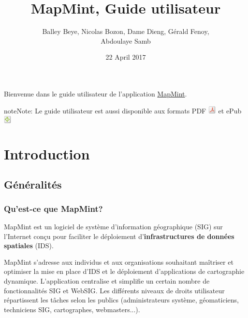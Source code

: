 \documentclass[letterpaper,10pt,french]{sphinxmanual}
\title{MapMint, Guide utilisateur}
\date{22 April 2017}
\author{Balley Beye, Nicolas Bozon, Dame Dieng, Gérald Fenoy, \\Abdoulaye Samb}
\begin{document}
\maketitle
\tableofcontents
{}\label{index::doc}


Bienvenue dans le guide utilisateur de l'application \href{http://mapmint.com}{MapMint}.

\begin{notice}{note}{Note:}
Le guide utilisateur est aussi disponible aux formats
PDF \includegraphics{pdf.png}  et ePub \includegraphics{epub.png}
\end{notice}


\chapter{Introduction}
\label{introduction/index:table-des-matieres}\label{introduction/index:home}\label{introduction/index::doc}\label{introduction/index:dashboard}\label{introduction/index:introduction}

\section{Généralités}
\label{introduction/introduction:generalites}\label{introduction/introduction::doc}\label{introduction/introduction:userguidegeneral}

\subsection{Qu’est-ce que MapMint?}
\label{introduction/introduction:quest-ce-que-mapmint}
MapMint est un logiciel de système d'information géographique (SIG) sur l'Internet  conçu pour faciliter le déploiement d'\textbf{infrastructures de données spatiales} (IDS).

MapMint s'adresse aux individus et aux organisations souhaitant maîtriser et optimiser la mise en place d'IDS et le déploiement d'applications de cartographie dynamique. L'application centralise et simplifie un certain nombre de fonctionnalités SIG et WebSIG. Les différents niveaux de droits utilisateur répartissent les tâches selon les publics (administrateurs système, géomaticiens, techniciens SIG, cartographes, webmasters...).
\end{document}
